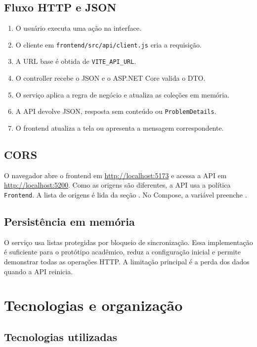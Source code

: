 \documentclass[12pt,a4paper,openany]{report}
\begin{document}
\section{Fluxo HTTP e JSON}

\begin{enumerate}
  \item O usuário executa uma ação na interface.
  \item O cliente em \texttt{frontend/src/api/client.js} cria a requisição.
  \item A URL base é obtida de \texttt{VITE\_API\_URL}.
  \item O controller recebe o JSON e o ASP.NET Core valida o DTO.
  \item O serviço aplica a regra de negócio e atualiza as coleções em memória.
  \item A API devolve JSON, resposta sem conteúdo ou \texttt{ProblemDetails}.
  \item O frontend atualiza a tela ou apresenta a mensagem correspondente.
\end{enumerate}

\section{CORS}

O navegador abre o frontend em \url{http://localhost:5173} e acessa a API em \url{http://localhost:5200}. Como as origens são diferentes, a API usa a política \texttt{Frontend}. A lista de origens é lida da seção . No Compose, a variável  preenche .

\section{Persistência em memória}

O serviço usa listas protegidas por bloqueio de sincronização. Essa implementação é suficiente para o protótipo acadêmico, reduz a configuração inicial e permite demonstrar todas as operações HTTP. A limitação principal é a perda dos dados quando a API reinicia.

\chapter{Tecnologias e organização}

\section{Tecnologias utilizadas}
\end{document}
